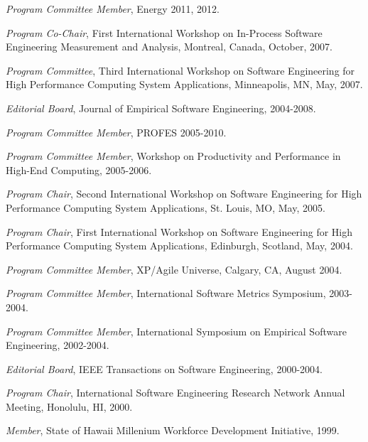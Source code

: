 \begin{Professional Activities}

\item {\em Program Committee Member}, Energy 2011, 2012.

\item {\em Program Co-Chair}, First International Workshop on In-Process
Software Engineering Measurement and Analysis, Montreal, Canada, October, 2007.

\item {\em Program Committee}, Third International Workshop on Software
Engineering for High Performance Computing System Applications, 
Minneapolis, MN,  May, 2007.

\item {\em Editorial Board}, Journal of Empirical Software Engineering, 2004-2008.

\item {\em Program Committee Member}, PROFES 2005-2010.

\item {\em Program Committee Member}, Workshop on Productivity and
Performance in High-End Computing, 2005-2006.

\item {\em Program Chair}, Second International Workshop on Software
Engineering for High Performance Computing System Applications, St. Louis,
MO, May, 2005.

\item {\em Program Chair}, First International Workshop on Software
Engineering for High Performance Computing System Applications, Edinburgh,
Scotland, May, 2004.

\item {\em Program Committee Member}, XP/Agile Universe,  Calgary, CA, August 2004.

\item {\em Program Committee Member}, International Software Metrics Symposium, 2003-2004. 

\item {\em Program Committee Member}, International Symposium on Empirical Software Engineering, 2002-2004.

\item {\em Editorial Board}, IEEE Transactions on Software Engineering, 2000-2004.

\item {\em Program Chair}, International Software Engineering Research Network Annual Meeting, Honolulu, HI, 2000.

\item {\em Member}, State of Hawaii Millenium Workforce Development Initiative, 1999.


\end{Professional Activities}
